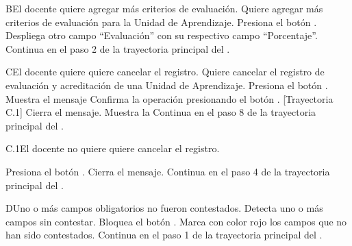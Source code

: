 

\begin{UCtrayectoriaA}{B}{El docente quiere agregar más criterios de evaluación.}
    \UCpaso[\UCactor] Quiere agregar más criterios de evaluación para la Unidad de Aprendizaje.
    \UCpaso[\UCactor] Presiona el botón .
    \UCpaso Despliega otro campo ``Evaluación'' con su respectivo campo ``Porcentaje''.
    \UCpaso Continua en el paso 2 de la trayectoria principal del .
\end{UCtrayectoriaA}


\begin{UCtrayectoriaA}{C}{El docente quiere quiere cancelar el registro.}
    \UCpaso[\UCactor] Quiere cancelar el registro de evaluación y acreditación de una Unidad de Aprendizaje.
    \UCpaso[\UCactor] Presiona el botón .
    \UCpaso Muestra el mensaje 
    \UCpaso[\UCactor] Confirma la operación presionando el botón . [Trayectoria C.1]
    \UCpaso Cierra el mensaje.
    \UCpaso Muestra la 
    \UCpaso Continua en el paso 8 de la trayectoria principal del .
\end{UCtrayectoriaA}


\begin{UCtrayectoriaA}{C.1}{El docente no quiere quiere cancelar el registro.}

    \UCpaso[\UCactor] Presiona el botón .
    \UCpaso Cierra el mensaje.
    \UCpaso Continua en el paso 4 de la trayectoria principal del .
\end{UCtrayectoriaA}


\begin{UCtrayectoriaA}{D}{Uno o más campos obligatorios no fueron contestados.}
    \UCpaso Detecta uno o más campos sin contestar.
    \UCpaso Bloquea el botón .
    \UCpaso Marca con color rojo los campos que no han sido contestados.
    \UCpaso Continua en el paso 1 de la trayectoria principal del .
\end{UCtrayectoriaA}


